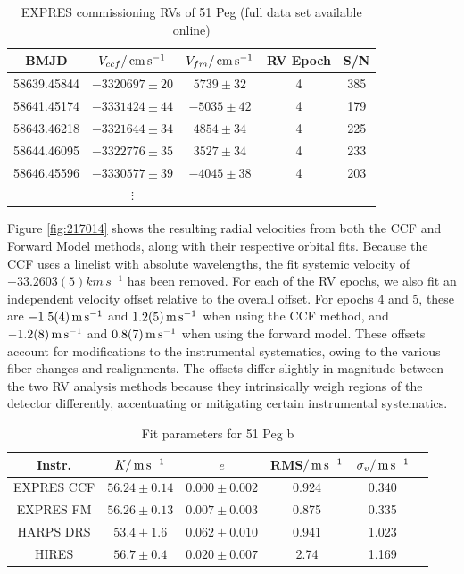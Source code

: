 \begin{table}[ht!]
    \centering
    \caption{EXPRES commissioning RVs of 51 Peg (full data set available online)
    \label{tab:51pegvels}}
    \begin{tabular}{ccccc}
        \hline
        BMJD & $V_{ccf}/{{\,\mathrm{cm\,s^{-1}}}}$ & $V_{fm}/{{\,\mathrm{cm\,s^{-1}}}}$ & RV Epoch & S/N
        \tabularnewline
        \hline
        58639.45844 & $-3320697\pm20$ & $ 5739\pm32$ & 4 & 385 \tabularnewline
        58641.45174 & $-3331424\pm44$ & $-5035\pm42$ & 4 & 179 \tabularnewline
        58643.46218 & $-3321644\pm34$ & $ 4854\pm34$ & 4 & 225 \tabularnewline
        58644.46095 & $-3322776\pm35$ & $ 3527\pm34$ & 4 & 233 \tabularnewline
        58646.45596 & $-3330577\pm39$ & $-4045\pm38$ & 4 & 203 \tabularnewline
         & \(\vdots\) & & \tabularnewline
        \hline
    \end{tabular}
\end{table}

Figure \ref{fig:217014} shows the resulting radial velocities from both the CCF and Forward Model methods, along with their respective orbital fits. Because the CCF uses a linelist with absolute wavelengths, the fit systemic velocity of $-33.2603(5)\unit{km\,s^{-1}}$ \citep[in excellent agreement with][]{gaia_collaboration_vizier_2018} has been removed. For each of the RV epochs, we also fit an independent velocity offset relative to the overall offset. For epochs 4 and 5, these are $-1.5(4){{\,\mathrm{m\,s^{-1}}}}$ and $1.2(5){{\,\mathrm{m\,s^{-1}}}}$ when using the CCF method, and $-1.2(8){{\,\mathrm{m\,s^{-1}}}}$ and $0.8(7){{\,\mathrm{m\,s^{-1}}}}$ when using the forward model. These offsets account for modifications to the instrumental systematics, owing to the various fiber changes and realignments. The offsets differ slightly in magnitude between the two RV analysis methods because they intrinsically weigh regions of the detector differently, accentuating or mitigating certain instrumental systematics.

\begin{table}[ht!]
\centering
\caption{Fit parameters for 51 Peg b\label{tab:51peg}}
\begin{tabular}{cccccc}
\hline
Instr. & $K/{{\,\mathrm{m\,s^{-1}}}}$ & $e$ & RMS$/{{\,\mathrm{m\,s^{-1}}}}$ & $\sigma_v/{{\,\mathrm{m\,s^{-1}}}}$ \tabularnewline
\hline
EXPRES CCF & $56.24\pm0.14$ & $0.000\pm0.002$ & 0.924 & 0.340 \tabularnewline
EXPRES FM & $56.26\pm0.13$ & $0.007\pm0.003$ & 0.875 & 0.335 \tabularnewline
HARPS DRS & $53.4\pm1.6$ & $0.062\pm0.010$ & 0.941 & 1.023 \tabularnewline
HIRES & $56.7\pm0.4$ & $0.020\pm0.007$ & 2.74 & 1.169 \tabularnewline
\hline
\end{tabular}
\end{table}

